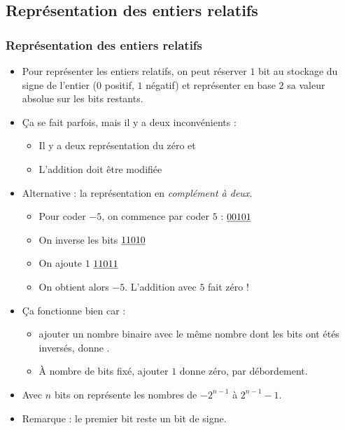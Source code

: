 \documentclass[xcolor=svgnames]{beamer}
\begin{document}
\subsection{Représentation des entiers relatifs}
\begin{frame}
 \frametitle{Représentation des entiers relatifs}
  \begin{itemize}
  \item Pour représenter les entiers relatifs, on peut réserver $1$
    bit au stockage du signe de l'entier ($0$ positif, $1$ négatif) et
    représenter en base $2$ sa valeur absolue sur les bits restants.\pause
\item Ça se fait parfois, mais il y a deux inconvénients :
    \begin{itemize}
      \item Il y a deux représentation du zéro  et 
      \item L'addition doit être modifiée\pause
    \end{itemize}
\item Alternative : la représentation en \alert{\emph{complément à deux}}. 
  \begin{itemize}
    \item Pour coder $-5$, on commence par coder $5$ : \hfill $\underline{00101}$\pause 
\item On inverse les bits  \hfill $\underline{11010}$\pause
\item On ajoute $1$ \hfill $\underline{11011}$\pause
\item On obtient alors $-5$. L'addition avec $5$ fait zéro !
  \end{itemize}\pause
\item Ça fonctionne bien car :
  \begin{itemize}
    \item
  ajouter un nombre binaire avec le même nombre dont les bits ont
  étés inversés, donne .\pause
\item À nombre de bits fixé, ajouter $1$ donne zéro,
  par débordement.
  \end{itemize}\pause
\item Avec $n$ bits on représente les nombres de $-2^{n-1}$ à $2^{n-1} - 1$.
\item Remarque : le premier bit reste un bit de signe.
  \end{itemize}
\end{frame}
\end{document}
